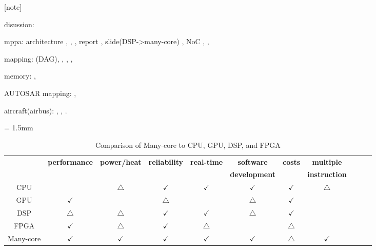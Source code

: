 \documentclass{sig-alternate-05-2015}
\begin{document}
[note]

disussion: \cite{saidi2015shift}

mppa:
  architecture \cite{de2013distributed}, \cite{de2013clustered}, \cite{de2014time},
  report \cite{kanter2015kalray}, 
  slide(DSP->many-core) \cite{de2015kalray},  
  NoC \cite{denet2017work}, \cite{deDinechin2014GSN},

mapping: \cite{perret2016mapping}(DAG), \cite{puffitsch2015off}, \cite{carle2014static}, \cite{becker2014mapping}, \cite{faragardi2014communication}

memory: \cite{perret2016predictable}, \cite{becker2016contention}

AUTOSAR mapping: \cite{becker2016contention}, \cite{faragardi2014communication}

aircraft(airbus): \cite{perret2016temporal}, \cite{perret2016predictable}, \cite{perret2016mapping}. 

\renewcommand{\arraystretch}{2.0}
\begin{table}[t]
  \caption{\label{tb:comparison_manu-core}
    Comparison of Many-core to CPU, GPU, DSP, and FPGA}
  \centering
  \scriptsize	                    %
  \tabcolsep = 1.5mm              %
  \begin{tabular}{c|cccccccccc}
    \hline
    & \multirow{2}{*}{\textbf{performance}} & \multirow{2}{*}{\textbf{power/heat}} & \multirow{2}{*}{\textbf{reliability}} & \multirow{2}{*}{\textbf{real-time}} & \textbf{software} & \multirow{2}{*}{\textbf{costs}} & \textbf{multiple}\\
    &&&&& \textbf{development} && \textbf{instruction} \\
    \hline
    \hline
    CPU & & \(\bigtriangleup\) & \(\checkmark\) & \(\checkmark\) & \(\checkmark\) & \(\checkmark\) & \(\bigtriangleup\) \\
    GPU & \(\checkmark\) &  & \(\bigtriangleup\) &  & \(\bigtriangleup\) & \(\checkmark\)\\
    DSP & \(\bigtriangleup\) & \(\bigtriangleup\) & \(\checkmark\) & \(\checkmark\) & \(\bigtriangleup\) & \(\checkmark\) & \\
    FPGA & \(\checkmark\) & \(\bigtriangleup\) & \(\checkmark\) & \(\bigtriangleup\) &  & \(\bigtriangleup\) & \\
    Many-core & \(\checkmark\) & \(\checkmark\) & \(\checkmark\) & \(\checkmark\) & \(\checkmark\) & \(\bigtriangleup\) & \(\checkmark\) \\
    \hline
  \end{tabular}
  \vspace{-5mm}
\end{table}
\end{document}
